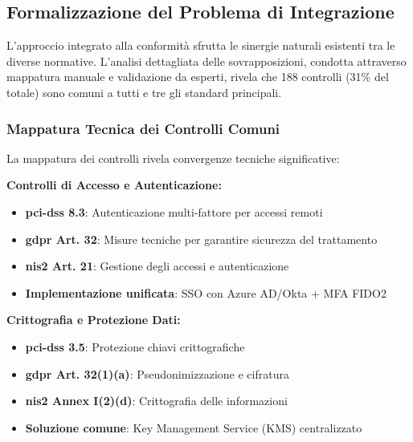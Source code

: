 \subsection{Formalizzazione del Problema di Integrazione}

L'approccio integrato alla conformità sfrutta le sinergie naturali esistenti tra le diverse normative. L'analisi dettagliata delle sovrapposizioni, condotta attraverso mappatura manuale e validazione da esperti, rivela che 188 controlli (31\% del totale) sono comuni a tutti e tre gli standard principali.

\subsubsection{Mappatura Tecnica dei Controlli Comuni}

La mappatura dei controlli rivela convergenze tecniche significative:

\textbf{Controlli di Accesso e Autenticazione:}
\begin{itemize}
    \item \textbf{\gls{pci-dss} 8.3}: Autenticazione multi-fattore per accessi remoti
    \item \textbf{\gls{gdpr} Art. 32}: Misure tecniche per garantire sicurezza del trattamento
    \item \textbf{\gls{nis2} Art. 21}: Gestione degli accessi e autenticazione
    \item \textbf{Implementazione unificata}: SSO con Azure AD/Okta + MFA FIDO2
\end{itemize}

\textbf{Crittografia e Protezione Dati:}
\begin{itemize}
    \item \textbf{\gls{pci-dss} 3.5}: Protezione chiavi crittografiche
    \item \textbf{\gls{gdpr} Art. 32(1)(a)}: Pseudonimizzazione e cifratura
    \item \textbf{\gls{nis2} Annex I(2)(d)}: Crittografia delle informazioni
    \item \textbf{Soluzione comune}: Key Management Service (KMS) centralizzato
\end{itemize}

